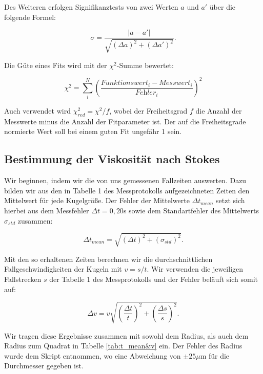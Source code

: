 \documentclass{article}
\begin{document}
Des Weiteren erfolgen Signifikanztests von zwei Werten $a$ und $a'$ über die folgende Formel:

\begin{equation}
    \sigma = \frac{|a-a'|}{\sqrt{(\Delta a)^2 + (\Delta a')^2}}.
\end{equation}

Die Güte eines Fits wird mit der $\chi^2$-Summe bewertet:

\begin{equation}
    \chi^2 = \sum_i^N \left( \frac{\textit{Funktionswert}_i - \textit{Messwert}_i}{\textit{Fehler}_i} \right)^2
\end{equation}

Auch verwendet wird $\chi^2_{red} = \chi^2 / f$, wobei der Freiheitsgrad $f$ die Anzahl der Messwerte minus die Anzahl der Fitparameter ist. Der auf die Freiheitsgrade normierte Wert soll bei einem guten Fit ungefähr 1 sein.

\newpage

\subsection{Bestimmung der Viskosität nach Stokes}

Wir beginnen, indem wir die von uns gemessenen Fallzeiten auswerten. Dazu bilden wir aus den in Tabelle 1 des Messprotokolls aufgezeichneten Zeiten den Mittelwert für jede Kugelgröße. Der Fehler der Mittelwerte $\Delta t_{mean}$ setzt sich hierbei aus dem Messfehler $\Delta t = 0,20$s sowie dem Standartfehler des Mittelwerts $\sigma_{std}$ zusammen:

\begin{equation}
    \Delta t_{mean} = \sqrt{(\Delta t)^2 + (\sigma_{std})^2}.
\end{equation}

Mit den so erhaltenen Zeiten berechnen wir die durchschnittlichen Fallgeschwindigkeiten der Kugeln mit $v = s/t$. Wir verwenden die jeweiligen Fallstrecken $s$ der Tabelle 1 des Messprotokolls und der Fehler beläuft sich somit auf:

\begin{equation}
    \Delta v = v \sqrt{\left( \frac{\Delta t}{t} \right)^2 + \left( \frac{\Delta s}{s} \right)^2}.
\end{equation}

Wir tragen diese Ergebnisse zusammen mit sowohl dem Radius, als auch dem Radius zum Quadrat in Tabelle \ref{tab:t_mean&v} ein. Der Fehler des Radius wurde dem Skript entnommen, wo eine Abweichung von $\pm 25 \mu$m für die Durchmesser gegeben ist.
\end{document}
